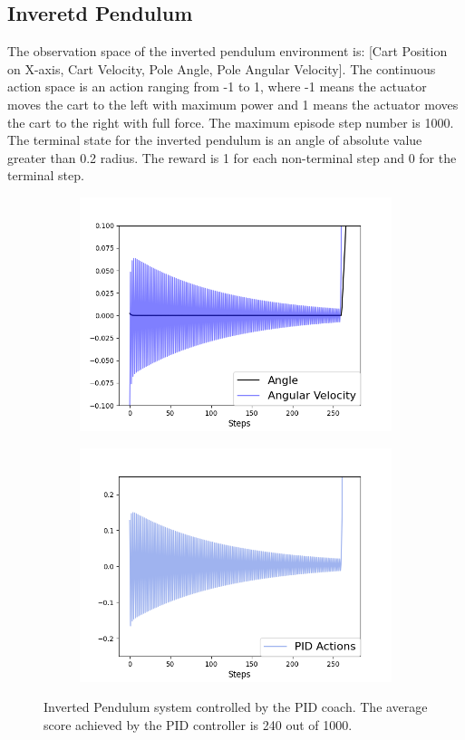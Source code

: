 \subsection{Inveretd Pendulum}
The observation space of the inverted pendulum environment is: [Cart Position on X-axis, Cart Velocity, Pole Angle, Pole Angular Velocity]. The continuous action space is an action ranging from -1 to 1, where -1 means the actuator moves the cart to the left with maximum power and 1 means the actuator moves the cart to the right with full force. The maximum episode step number is 1000. The terminal state for the inverted pendulum is an angle of absolute value greater than 0.2 radius. The reward is 1 for each non-terminal step and 0 for the terminal step. 
\begin{figure}
\centering
\begin{subfigure}{0.4\textwidth}
  \centering
  \includegraphics[width=\linewidth]{ip_PID.png}
  \label{fig:ip_pid}
\end{subfigure}%
\begin{subfigure}{.4\textwidth}
  \centering
  \includegraphics[width=\linewidth]{ip_PID_actions.png}
  \label{fig:ip_pid_actions}
\end{subfigure}
\caption{Inverted Pendulum system controlled by the PID coach. The average score achieved by the PID controller is 240 out of 1000.}
\label{fig:ip}
\end{figure}


